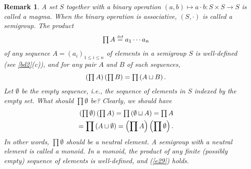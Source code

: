 \documentclass[a4paper,11pt,final,openany]{memoir}%
\newtheorem{remark}[X]{Remark}
\theoremstyle{nonumberplain}
\begin{document}
\begin{remark}
\label{bd3g}A set $S$ together with a binary operation $(a,b)\mapsto a\cdot
b\colon S\times S\rightarrow S$ is called a \emph{magma}. When the binary
operation is associative, $(S,\cdot)$ is called a \emph{semigroup}. The
product%
\[
\tstyle\prod A\overset{\textup{{\tiny def}}}{=}a_{1}\cdots a_{n}%
\]
of any sequence $A=(a_{i})_{1\leq i\leq n}$ of elements in a semigroup $S$ is
well-defined (see \ref{bd2}(c)), and for any pair $A$ and $B$ of such
sequences,%
\begin{equation}
\tstyle\left(  \prod A\right)  \left(  \prod B\right)  =\prod\left(  A\sqcup
B\right)  \text{.} \label{e29}%
\end{equation}
Let $\emptyset$ be the empty sequence, i.e., the sequence of elements in $S$
indexed by the empty set. What should $\prod\emptyset$ be? Clearly, we should
have%
\begin{align*}
\textstyle\left(  \prod\emptyset\right)  \left(  \prod A\right)  =\prod\left(
\emptyset\sqcup A\right)  =\prod A\\
=\prod\left(  A\sqcup\emptyset\right)
=\left(  \prod A\right)  \left(  \prod\emptyset\right)  .
\end{align*}
In other words, $\prod\emptyset$ should be a neutral element. A semigroup with
a neutral element is called a \emph{monoid}. In a monoid, the product of any
finite (possibly empty) sequence of elements is well-defined, and (\ref{e29}) holds.
\end{remark}
\end{document}
